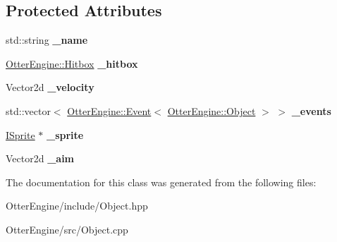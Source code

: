 \subsection*{Protected Attributes}
\begin{DoxyCompactItemize}
\item 
std\+::string {\bfseries \+\_\+name}\hypertarget{class_otter_engine_1_1_object_a81cbe10016eb7360fd3873f699bc2d60}{}\label{class_otter_engine_1_1_object_a81cbe10016eb7360fd3873f699bc2d60}

\item 
\hyperlink{class_otter_engine_1_1_hitbox}{Otter\+Engine\+::\+Hitbox} {\bfseries \+\_\+hitbox}\hypertarget{class_otter_engine_1_1_object_a15b6e302795c9b79f65c5b2a8f4fb6fd}{}\label{class_otter_engine_1_1_object_a15b6e302795c9b79f65c5b2a8f4fb6fd}

\item 
Vector2d {\bfseries \+\_\+velocity}\hypertarget{class_otter_engine_1_1_object_acd84fb5bf3cc768d88417f9bf6d197a7}{}\label{class_otter_engine_1_1_object_acd84fb5bf3cc768d88417f9bf6d197a7}

\item 
std\+::vector$<$ \hyperlink{class_otter_engine_1_1_event}{Otter\+Engine\+::\+Event}$<$ \hyperlink{class_otter_engine_1_1_object}{Otter\+Engine\+::\+Object} $>$ $>$ {\bfseries \+\_\+events}\hypertarget{class_otter_engine_1_1_object_a368e53895ba83a22f64c7b27d648e269}{}\label{class_otter_engine_1_1_object_a368e53895ba83a22f64c7b27d648e269}

\item 
\hyperlink{class_otter_engine_1_1_i_sprite}{I\+Sprite} $\ast$ {\bfseries \+\_\+sprite}\hypertarget{class_otter_engine_1_1_object_aea8f45812619b29aaca0839f04169418}{}\label{class_otter_engine_1_1_object_aea8f45812619b29aaca0839f04169418}

\item 
Vector2d {\bfseries \+\_\+aim}\hypertarget{class_otter_engine_1_1_object_a52d93e7ed12a2913da66d04b1564b839}{}\label{class_otter_engine_1_1_object_a52d93e7ed12a2913da66d04b1564b839}

\end{DoxyCompactItemize}


The documentation for this class was generated from the following files\+:\begin{DoxyCompactItemize}
\item 
Otter\+Engine/include/Object.\+hpp\item 
Otter\+Engine/src/Object.\+cpp\end{DoxyCompactItemize}
